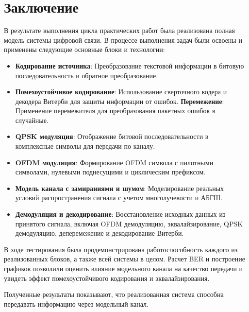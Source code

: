 \chapter*{Заключение}

В результате выполнения цикла практических работ была реализована полная модель системы цифровой связи. В процессе выполнения задач были освоены и применены следующие основные блоки и технологии:
\begin{itemize}
    \item \textbf{Кодирование источника}: Преобразование текстовой информации в битовую последовательность и обратное преобразование.
    \item \textbf{Помехоустойчивое кодирование}: Использование сверточного кодера и декодера Витерби для защиты информации от ошибок.
    \textbf{Перемежение}: Применение перемежителя для преобразования пакетных ошибок в случайные.
    \item \textbf{QPSK модуляция}: Отображение битовой последовательности в комплексные символы для передачи по каналу.
    \item \textbf{OFDM модуляция}: Формирование OFDM символа с пилотными символами, нулевыми поднесущими и циклическим префиксом.
    \item \textbf{Модель канала с замираниями и шумом}: Моделирование реальных условий распространения сигнала с учетом многолучевости и АБГШ.
    \item \textbf{Демодуляция и декодирование}: Восстановление исходных данных из принятого сигнала, включая OFDM демодуляцию, эквалайзирование, QPSK демодуляцию, деперемежение и декодирование Витерби.
\end{itemize}
В ходе тестирования была продемонстрирована работоспособность каждого из реализованных блоков, а также всей системы в целом. Расчет BER и построение графиков позволили оценить влияние модельного канала на качество передачи и увидеть эффект помехоустойчивого кодирования и эквалайзирования.

Полученные результаты показывают, что реализованная система способна передавать информацию через модельный канал.